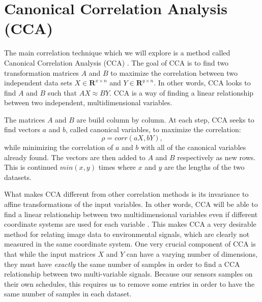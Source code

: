 \chapter{Canonical Correlation Analysis (CCA)}
\label{cpt:cca}
The main correlation technique which we will explore is a method called Canonical Correlation Analysis (CCA) \cite{hotelling}. The goal of CCA is to find two transformation matrices $A$ and $B$ to maximize the correlation between two independent data sets $X \in \mathbf{R}^{x\times n}$ and $Y \in \mathbf{R}^{y\times n}$. In other words, CCA looks to find $A$ and $B$ such that $AX\approx BY$. CCA is a way of finding a linear relationship between two independent, multidimensional variables.

The matrices $A$ and $B$ are build column by column. At each step, CCA seeks to find vectors $a$ and $b$, called canonical variables, to maximize the correlation:
\begin{equation}\label{eq:maxcorrcca}\rho = corr(aX,bY),\end{equation}
while minimizing the correlation of $a$ and $b$ with all of the canonical variables already found. The vectors are then added to $A$ and $B$ respectively as new rows. This is continued $min(x,y)$ times where $x$ and $y$ are the lengths of the two datasets.

What makes CCA different from other correlation methods is its invariance to affine transformations of the input variables. In other words, CCA will be able to find a linear relationship between two multidimensional variables even if different coordinate systems are used for each variable \cite{bkl97}. This makes CCA a very desirable method for relating image data to environmental signals, which are clearly not measured in the same coordinate system. One very crucial component of CCA is that while the input matrices $X$ and $Y$ can have a varying number of dimensions, they must have \textit{exactly} the same number of samples in order to find a CCA relationship between two multi-variable signals. Because our sensors samples on their own schedules, this requires us to remove some entries in order to have the same number of samples in each dataset.

